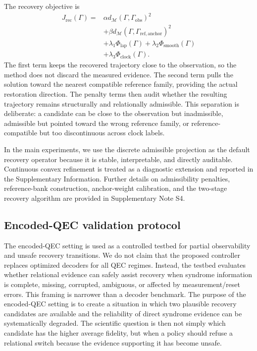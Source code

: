 \documentclass{iopjournal}
\begin{document}
The recovery objective is
\begin{equation}
\begin{aligned}
J_{\mathrm{rec}}(\Gamma)
= {}&
\alpha
d_{\mathcal{M}}\!\left(\Gamma,\Gamma_{\mathrm{obs}}\right)^2
\\
&+
\beta
d_{\mathcal{M}}\!\left(\Gamma,\Gamma_{\mathrm{ref,anchor}}\right)^2
\\
&+
\lambda_1\Phi_{\mathrm{lap}}(\Gamma)
+
\lambda_2\Phi_{\mathrm{smooth}}(\Gamma)
\\
&+
\lambda_3\Phi_{\mathrm{clock}}(\Gamma).
\end{aligned}
\label{eq:recovery-objective-main}
\end{equation}
The first term keeps the recovered trajectory close to the observation, so the
method does not discard the measured evidence. The second term pulls the solution
toward the nearest compatible reference family, providing the actual restoration
direction. The penalty terms then audit whether the resulting trajectory remains
structurally and relationally admissible. This separation is deliberate: a
candidate can be close to the observation but inadmissible, admissible but pointed
toward the wrong reference family, or reference-compatible but too discontinuous
across clock labels.

In the main experiments, we use the discrete admissible projection as the default
recovery operator because it is stable, interpretable, and directly auditable.
Continuous convex refinement is treated as a diagnostic extension and reported in
the Supplementary Information. Further details on admissibility penalties,
reference-bank construction, anchor-weight calibration, and the two-stage recovery
algorithm are provided in Supplementary Note S4.

\subsection{Encoded-QEC validation protocol}\label{subsec:qec-validation}

The encoded-QEC setting is used as a controlled testbed for partial observability
and unsafe recovery transitions. We do not claim that the proposed controller
replaces optimized decoders for all QEC regimes. Instead, the testbed evaluates
whether relational evidence can safely assist recovery when syndrome information is
complete, missing, corrupted, ambiguous, or affected by measurement/reset errors.
This framing is narrower than a decoder benchmark. The purpose of the encoded-QEC
setting is to create a situation in which two plausible recovery candidates are
available and the reliability of direct syndrome evidence can be systematically
degraded. The scientific question is then not simply which candidate has the
higher average fidelity, but when a policy should refuse a relational switch
because the evidence supporting it has become unsafe.
\end{document}
